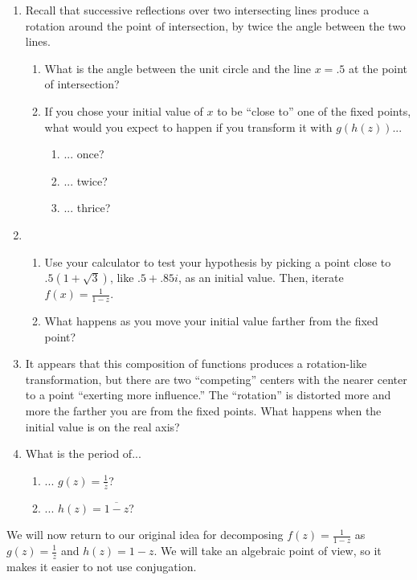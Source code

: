 \documentclass[../gatm.tex]{subfiles}
\begin{document}
\begin{enumerate}
\setcounter{enumi}{\value{problem_i}}
\item Recall that successive reflections over two intersecting lines produce a rotation around the point of intersection, by twice the angle between the two lines.
\begin{enumerate}
\item What is the angle between the unit circle and the line $x=.5$ at the point of intersection?
\item If you chose your initial value of $x$ to be ``close to'' one of the fixed points, what would you expect to happen if you transform it with $g(h(z))$...
\begin{multicols}{3}
\begin{enumerate}
\item ... once?
\item ... twice?
\item ... thrice?
\end{enumerate}
\end{multicols}
\end{enumerate}
\item \begin{enumerate}
\item Use your calculator to test your hypothesis by picking a point close to $.5(1+\sqrt{3})$, like $.5+.85i$, as an initial value. Then, iterate $f(x)=\frac{1}{1-z}$.
\item What happens as you move your initial value farther from the fixed point?
\end{enumerate}
\item It appears that this composition of functions produces a rotation-like transformation, but there are two ``competing'' centers with the nearer center to a point ``exerting more influence.'' The ``rotation'' is distorted more and more the farther you are from the fixed points. What happens when the initial value is on the real axis?
\item What is the period of...
\begin{enumerate}
\item ... $g(z)=\frac{1}{\overline{z}}$?
\item ... $h(z)=\overline{1-z}$?
\end{enumerate}
\setcounter{problem_i}{\value{enumi}}
\end{enumerate}

We will now return to our original idea for decomposing $f(z)=\frac{1}{1-z}$ as $g(z)=\frac{1}{z}$ and $h(z)=1-z$. We will take an algebraic point of view, so it makes it easier to not use conjugation.
\end{document}
